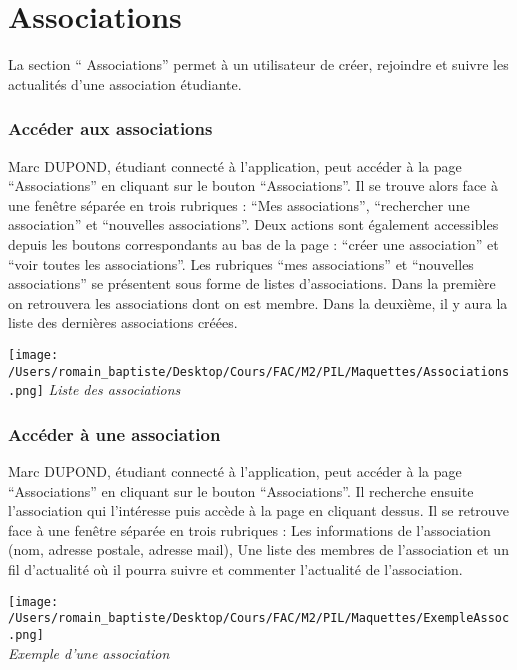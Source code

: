 \section*{Associations}
La section “ Associations” permet à un utilisateur de créer, rejoindre et suivre les actualités d’une association étudiante.
\subsubsection*{Accéder aux associations} 
Marc DUPOND, étudiant connecté à l’application, peut accéder à la page “Associations” en cliquant sur le bouton “Associations”. Il se trouve alors face à une fenêtre séparée en trois rubriques : “Mes associations”, “rechercher une association” et “nouvelles associations”. Deux actions sont également accessibles depuis les boutons correspondants au bas de la page : “créer une association” et “voir toutes les associations”.
Les rubriques “mes associations” et “nouvelles associations” se présentent sous forme de listes d’associations. Dans la première on retrouvera les associations dont on est membre. Dans la deuxième, il y aura la liste des dernières associations créées.
\begin{center}
\texttt{[image: /Users/romain\_baptiste/Desktop/Cours/FAC/M2/PIL/Maquettes/Associations.png]}
\emph{Liste des associations}
\end{center}
\subsubsection*{Accéder à une association}
Marc DUPOND, étudiant connecté à l’application, peut accéder à la page “Associations” en cliquant sur le bouton “Associations”. Il recherche ensuite l’association qui l’intéresse puis accède à la page en cliquant dessus. Il se retrouve face à une fenêtre séparée en trois rubriques : Les informations de l’association (nom, adresse postale, adresse mail), Une liste des membres de l’association et un fil d’actualité où il pourra suivre et commenter l’actualité de l’association.
\begin{center}
\texttt{[image: /Users/romain\_baptiste/Desktop/Cours/FAC/M2/PIL/Maquettes/ExempleAssoc.png]}
\\
\emph{Exemple d'une association}
\end{center}

